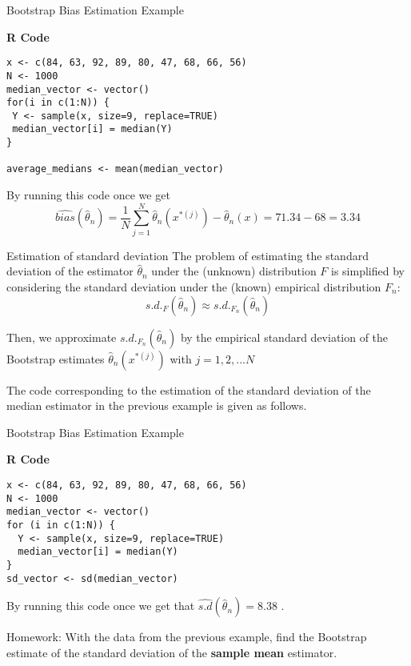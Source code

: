 \documentclass[8pt]{beamer}
\begin{document}
\begin{frame}[fragile]{Bootstrap Bias Estimation Example}

\textbf{R Code}
\begin{lstlisting}
x <- c(84, 63, 92, 89, 80, 47, 68, 66, 56)
N <- 1000
median_vector <- vector()
for(i in c(1:N)) {
 Y <- sample(x, size=9, replace=TRUE) 
 median_vector[i] = median(Y)
}

average_medians <- mean(median_vector)
\end{lstlisting}

By running this code once we get 
\begin{equation*}
\widehat{bias}\left(\widehat{\theta}_n\right) =
\frac{1}{N} \sum_{j=1}^N \widehat{\theta}_n\left(x^{*(j)}\right) - \widehat{\theta}_n(x)=71.34-68=3.34
\end{equation*}
\end{frame}

\begin{frame}{Estimation of standard deviation}
The problem of estimating the standard deviation of the estimator $\widehat{\theta}_n$ under the (unknown) distribution $F$ is simplified by considering the standard deviation under the (known) empirical distribution $F_n$:
\begin{equation*}
	s.d._F\left(\widehat{\theta}_n\right) \approx s.d._{F_n}\left(\widehat{\theta}_n\right)
\end{equation*}

Then, we approximate $s.d._{F_n}\left(\widehat{\theta}_n\right)$ by the empirical standard deviation of the Bootstrap estimates $\widehat{\theta}_n\left(x^{*(j)}\right)$ with $j=1,2,...N$

The code corresponding to the estimation of the standard deviation of the median estimator in the previous example is given as follows.
\end{frame}

\begin{frame}[fragile]{Bootstrap Bias Estimation Example}

\textbf{R Code}

\begin{lstlisting}
x <- c(84, 63, 92, 89, 80, 47, 68, 66, 56)
N <- 1000
median_vector <- vector()
for (i in c(1:N)) {
  Y <- sample(x, size=9, replace=TRUE) 
  median_vector[i] = median(Y)
}
sd_vector <- sd(median_vector)
\end{lstlisting}

By running this code once we get that  $\widehat{s.d}(\widehat{\theta}_n)= 8.38$ . 
\end{frame}

\begin{frame}{Homework:}
With the data from the previous example, find the Bootstrap estimate of the standard deviation of the {\bf sample mean} estimator.
\end{frame}
\end{document}
